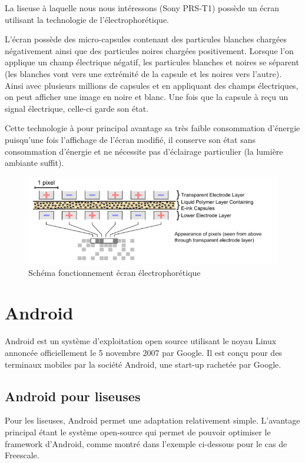 La liseuse à laquelle nous nous intéressons (Sony PRS-T1) possède un écran utilisant la technologie de l'électrophorétique.

L'écran possède des micro-capsules contenant des particules blanches chargées négativement ainsi que des particules noires chargées positivement. Lorsque l'on applique un champ électrique négatif, les particules blanches et noires se séparent (les blanches vont vers une extrémité de la capsule et les noires vers l'autre). Ainsi avec plusieurs millions de capsules et en appliquant des champs électriques, on peut afficher une image en noire et blanc. Une fois que la capsule à reçu un signal électrique, celle-ci garde son état.

Cette technologie à pour principal avantage sa très faible consommation d'énergie puisqu'une fois l'affichage de l'écran modifié, il conserve son état sans consommation d'énergie et ne nécessite pas d'éclairage particulier (la lumière ambiante suffit).

\begin{figure}[h!]
\begin{center}
	\includegraphics{Electrophoretic.png}
	\caption{Schéma fonctionnement écran électrophorétique}
\end{center}
\end{figure}

\newpage

\section{Android}
Android est un système d'exploitation open source utilisant le noyau Linux annoncée officiellement le 5 novembre 2007 par Google. Il est conçu pour des terminaux mobiles par la société Android, une start-up rachetée par Google.

\subsection{Android pour liseuses}
Pour les liseuses, Android permet une adaptation relativement simple. L'avantage principal étant le système open-source qui permet de pouvoir optimiser le framework d'Android, comme montré dans l'exemple ci-dessous pour le cas de Freescale.\\

